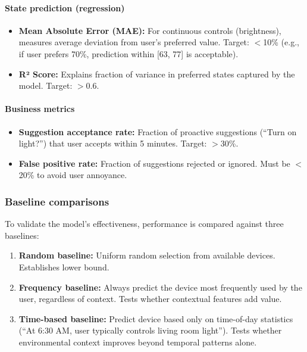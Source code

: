 \paragraph{State prediction (regression)}
\begin{itemize}
    \item \textbf{Mean Absolute Error (MAE):} For continuous controls (brightness), measures average deviation from user's preferred value. Target: $<$10\% (e.g., if user prefers 70\%, prediction within [63, 77] is acceptable).
    
    \item \textbf{R² Score:} Explains fraction of variance in preferred states captured by the model. Target: $>$0.6.
\end{itemize}

\paragraph{Business metrics}
\begin{itemize}
    \item \textbf{Suggestion acceptance rate:} Fraction of proactive suggestions (``Turn on light?'') that user accepts within 5 minutes. Target: $>$30\%.
    
    \item \textbf{False positive rate:} Fraction of suggestions rejected or ignored. Must be $<$20\% to avoid user annoyance.
\end{itemize}

\subsubsection{Baseline comparisons}

To validate the model's effectiveness, performance is compared against three baselines:

\begin{enumerate}
    \item \textbf{Random baseline:} Uniform random selection from available devices. Establishes lower bound.
    
    \item \textbf{Frequency baseline:} Always predict the device most frequently used by the user, regardless of context. Tests whether contextual features add value.
    
    \item \textbf{Time-based baseline:} Predict device based only on time-of-day statistics (``At 6:30 AM, user typically controls living room light''). Tests whether environmental context improves beyond temporal patterns alone.
\end{enumerate}

